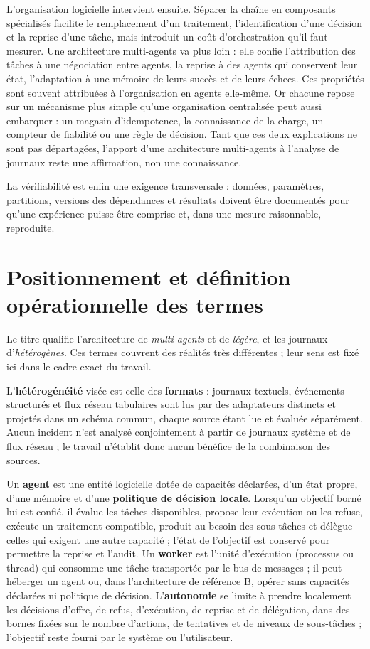 L'organisation logicielle intervient ensuite. Séparer la chaîne en composants spécialisés facilite le remplacement d'un traitement, l'identification d'une décision et la reprise d'une tâche, mais introduit un coût d'orchestration qu'il faut mesurer. Une architecture multi-agents va plus loin : elle confie l'attribution des tâches à une négociation entre agents, la reprise à des agents qui conservent leur état, l'adaptation à une mémoire de leurs succès et de leurs échecs. Ces propriétés sont souvent attribuées à l'organisation en agents elle-même. Or chacune repose sur un mécanisme plus simple qu'une organisation centralisée peut aussi embarquer : un magasin d'idempotence, la connaissance de la charge, un compteur de fiabilité ou une règle de décision. Tant que ces deux explications ne sont pas départagées, l'apport d'une architecture multi-agents à l'analyse de journaux reste une affirmation, non une connaissance.

La vérifiabilité est enfin une exigence transversale : données, paramètres, partitions, versions des dépendances et résultats doivent être documentés pour qu'une expérience puisse être comprise et, dans une mesure raisonnable, reproduite.


\section*{Positionnement et définition opérationnelle des termes}


Le titre qualifie l'architecture de \textit{multi-agents} et de \textit{légère}, et les journaux d'\textit{hétérogènes}. Ces termes couvrent des réalités très différentes ; leur sens est fixé ici dans le cadre exact du travail.

L'\textbf{hétérogénéité} visée est celle des \textbf{formats} : journaux textuels, événements structurés et flux réseau tabulaires sont lus par des adaptateurs distincts et projetés dans un schéma commun, chaque source étant lue et évaluée séparément. Aucun incident n'est analysé conjointement à partir de journaux système et de flux réseau ; le travail n'établit donc aucun bénéfice de la combinaison des sources.

Un \textbf{agent} est une entité logicielle dotée de capacités déclarées, d'un état propre, d'une mémoire et d'une \textbf{politique de décision locale}. Lorsqu'un objectif borné lui est confié, il évalue les tâches disponibles, propose leur exécution ou les refuse, exécute un traitement compatible, produit au besoin des sous-tâches et délègue celles qui exigent une autre capacité ; l'état de l'objectif est conservé pour permettre la reprise et l'audit. Un \textbf{worker} est l'unité d'exécution (processus ou thread) qui consomme une tâche transportée par le bus de messages ; il peut héberger un agent ou, dans l'architecture de référence B, opérer sans capacités déclarées ni politique de décision. L'\textbf{autonomie} se limite à prendre localement les décisions d'offre, de refus, d'exécution, de reprise et de délégation, dans des bornes fixées sur le nombre d'actions, de tentatives et de niveaux de sous-tâches ; l'objectif reste fourni par le système ou l'utilisateur.

